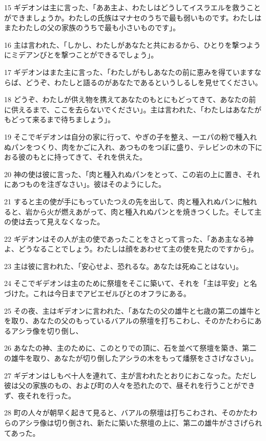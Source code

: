 \par 15 ギデオンは主に言った、「ああ主よ、わたしはどうしてイスラエルを救うことができましょうか。わたしの氏族はマナセのうちで最も弱いものです。わたしはまたわたしの父の家族のうちで最も小さいものです」。
\par 16 主は言われた、「しかし、わたしがあなたと共におるから、ひとりを撃つようにミデアンびとを撃つことができるでしょう」。
\par 17 ギデオンはまた主に言った、「わたしがもしあなたの前に恵みを得ていますならば、どうぞ、わたしと語るのがあなたであるというしるしを見せてください。
\par 18 どうぞ、わたしが供え物を携えてあなたのもとにもどってきて、あなたの前に供えるまで、ここを去らないでください」。主は言われた、「わたしはあなたがもどって来るまで待ちましょう」。
\par 19 そこでギデオンは自分の家に行って、やぎの子を整え、一エパの粉で種入れぬパンをつくり、肉をかごに入れ、あつものをつぼに盛り、テレビンの木の下におる彼のもとに持ってきて、それを供えた。
\par 20 神の使は彼に言った、「肉と種入れぬパンをとって、この岩の上に置き、それにあつものを注ぎなさい」。彼はそのようにした。
\par 21 すると主の使が手にもっていたつえの先を出して、肉と種入れぬパンに触れると、岩から火が燃えあがって、肉と種入れぬパンとを焼きつくした。そして主の使は去って見えなくなった。
\par 22 ギデオンはその人が主の使であったことをさとって言った、「ああ主なる神よ、どうなることでしょう。わたしは顔をあわせて主の使を見たのですから」。
\par 23 主は彼に言われた、「安心せよ、恐れるな。あなたは死ぬことはない」。
\par 24 そこでギデオンは主のために祭壇をそこに築いて、それを「主は平安」と名づけた。これは今日までアビエゼルびとのオフラにある。
\par 25 その夜、主はギデオンに言われた、「あなたの父の雄牛と七歳の第二の雄牛とを取り、あなたの父のもっているバアルの祭壇を打ちこわし、そのかたわらにあるアシラ像を切り倒し、
\par 26 あなたの神、主のために、このとりでの頂に、石を並べて祭壇を築き、第二の雄牛を取り、あなたが切り倒したアシラの木をもって燔祭をささげなさい」。
\par 27 ギデオンはしもべ十人を連れて、主が言われたとおりにおこなった。ただし彼は父の家族のもの、および町の人々を恐れたので、昼それを行うことができず、夜それを行った。
\par 28 町の人々が朝早く起きて見ると、バアルの祭壇は打ちこわされ、そのかたわらのアシラ像は切り倒され、新たに築いた祭壇の上に、第二の雄牛がささげられてあった。

